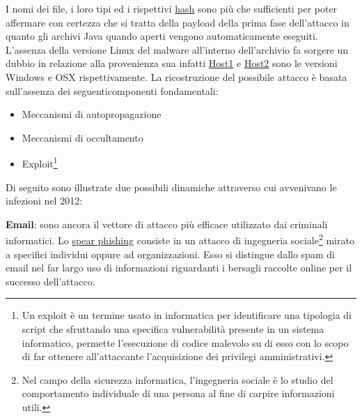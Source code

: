 \documentclass[12pt,oneside]{fithesis2}
\begin{document}
        \begin{center}
        \end{center}

        I nomi dei file, i loro tipi ed i rispettivi \url{hash} sono più che sufficienti per poter affermare con certezza che si tratta della payload della prima fase dell'attacco in quanto gli archivi Java quando aperti vengono automaticamente eseguiti. L'assenza della versione Linux del malware all'interno dell'archivio fa sorgere un dubbio in relazione alla provenienza sua infatti \url{Host1} e \url{Host2} sono le versioni Windows e OSX rispettivamente.\newline
        La ricostruzione del possibile attacco è basata sull'assenza dei seguenticomponenti fondamentali:\newline

        \begin{itemize}
            \item Meccanismi di autopropagazione
            \item Meccanismi di occultamento
            \item Exploit\footnote{Un exploit è un termine usato in informatica per identificare una tipologia di script che sfruttando una specifica vulnerabilità presente in un sistema informatico, permette l'esecuzione di codice malevolo su di esso con lo scopo di far ottenere all'attaccante l'acquisizione dei privilegi amministrativi.}
        \end{itemize}
        
        Di seguito sono illustrate due possibili dinamiche attraverso cui avvenivano le infezioni nel 2012:%

        \textbf{Email}: sono ancora il vettore di attacco più efficace utilizzato dai criminali informatici. Lo \url{spear phishing} consiste in un attacco di ingegneria sociale\footnote{Nel campo della sicurezza informatica, l'ingegneria sociale è lo studio del comportamento individuale di una persona al fine di carpire informazioni utili.} mirato a specifici individui oppure ad organizzazioni. Esso si distingue dallo spam di email nel far largo uso di informazioni riguardanti i bersagli raccolte online per il successo dell'attacco. %
        \vspace{1mm}
        
\end{document}
